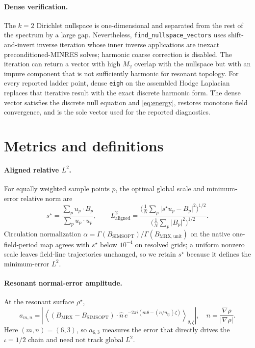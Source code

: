 \documentclass[11pt,a4paper]{article}
\begin{document}
\paragraph{Dense verification.}
The \(k=2\) Dirichlet nullspace is one-dimensional and separated from the rest
of the spectrum by a large gap.  Nevertheless,
\texttt{find\_nullspace\_vectors} uses shift-and-invert inverse iteration whose
inner inverse applications are inexact preconditioned-MINRES solves; harmonic
coarse correction is disabled.  The iteration can return a vector with high
\(M_2\) overlap with the nullspace but with an impure component that is not
sufficiently harmonic for resonant topology.  For every reported ladder point,
dense \texttt{eigh} on the assembled Hodge Laplacian replaces that iterative
result with the exact discrete harmonic form.  The dense vector satisfies the
discrete null equation and \eqref{eq:energy}, restores monotone field
convergence, and is the sole vector used for the reported diagnostics.

\section{Metrics and definitions}
\label{sec:metrics}

\paragraph{Aligned relative \(L^2\).}
For equally weighted sample points \(p\), the optimal global scale and
minimum-error relative norm are
\begin{equation}
\label{eq:l2aligned}
s^\star=\frac{\sum_pu_p\!\cdot\!B_p}{\sum_pu_p\!\cdot\!u_p},\qquad
L^2_{\mathrm{aligned}}
=\frac{\bigl(\tfrac1N\sum_p\lvert s^\star u_p-B_p\rvert^2\bigr)^{1/2}}
       {\bigl(\tfrac1N\sum_p\lvert B_p\rvert^2\bigr)^{1/2}} .
\end{equation}
Circulation normalization
\(\alpha=\Gamma(B_{\mathrm{SIMSOPT}})/\Gamma(B_{\mathrm{MRX,unit}})\) on the
native one-field-period map agrees with \(s^\star\) below \(10^{-4}\) on
resolved grids; a uniform nonzero scale leaves field-line trajectories
unchanged, so we retain \(s^\star\) because it defines the minimum-error
\(L^2\).

\paragraph{Resonant normal-error amplitude.}
At the resonant surface \(\rho^\star\),
\begin{equation}
\label{eq:a63}
a_{m,n}=\left\lvert\left\langle
\left(B_{\mathrm{MRX}}-B_{\mathrm{SIMSOPT}}\right)\!\cdot\!\hat n\,
e^{-2\pi i(m\theta-(n/n_{\mathrm{fp}})\zeta)}
\right\rangle_{\theta,\zeta}\right\rvert,
\quad
\hat n=\frac{\nabla\rho}{\lvert\nabla\rho\rvert}.
\end{equation}
Here \((m,n)=(6,3)\), so \(a_{6,3}\) measures the error that directly drives
the \(\iota=1/2\) chain and need not track global \(L^2\).
\end{document}
